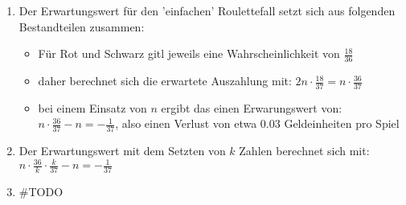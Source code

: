 \begin{enumerate}
	\item Der Erwartungswert für den 'einfachen' Roulettefall setzt sich aus folgenden Bestandteilen zusammen:
	\begin{itemize}
		\item Für Rot und Schwarz gitl jeweils eine Wahrscheinlichkeit von $\frac{18}{36} $
		\item daher berechnet sich die erwartete Auszahlung mit: $2n \cdot \frac{18}{37}=n\cdot \frac{36}{37} $
		\item bei einem Einsatz von $n$ ergibt das einen Erwarungswert von: $n\cdot \frac{36}{37} - n = -\frac{1}{37}$, also einen Verlust von etwa 0.03 Geldeinheiten pro Spiel
	\end{itemize}
	\item Der Erwartungswert mit dem Setzten von $k$ Zahlen berechnet sich mit: $n\cdot\frac{36}{k} \cdot \frac{k}{37} -n=-\frac{1}{37}$
	\item \#TODO

\end{enumerate}
